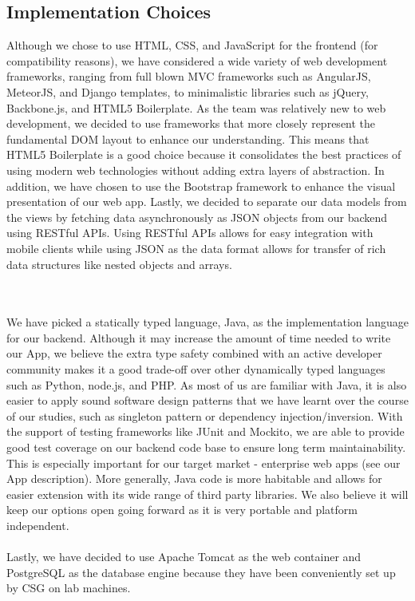 \documentclass[10pt,a4paper]{article}
\begin{document}
\subsection{Implementation Choices}

Although we chose to use HTML, CSS, and JavaScript for the frontend (for 
compatibility reasons), we have considered a wide variety of web development 
frameworks, ranging from full blown MVC frameworks such as AngularJS, MeteorJS, 
and Django templates, to minimalistic libraries such as jQuery, Backbone.js, and 
HTML5 Boilerplate. As the team was relatively new to web development, we decided 
to use frameworks that more closely represent the fundamental DOM layout to 
enhance our understanding. This means that HTML5 Boilerplate is a good choice 
because it consolidates the best practices of using modern web technologies 
without adding extra layers of abstraction. In addition, we have chosen to use 
the Bootstrap framework to enhance the visual presentation of our web app. 
Lastly, we decided to separate our data models from the views by fetching data 
asynchronously as JSON objects from our backend using RESTful APIs. Using 
RESTful APIs allows for easy integration with mobile clients while using JSON as 
the data format allows for transfer of rich data structures like nested objects 
and arrays.

\\
\\
\noindent
We have picked a statically typed language, Java, as the implementation language 
for our backend. Although it may increase the amount of time needed to write our 
App, we believe the extra type safety combined with an active developer 
community makes it a good trade-off over other dynamically typed languages such 
as Python, node.js, and PHP. As most of us are familiar with Java, it is also 
easier to apply sound software design patterns that we have learnt over the 
course of our studies, such as singleton pattern or dependency 
injection/inversion. With the support of testing frameworks like JUnit and 
Mockito, we are able to provide good test coverage on our backend code base to 
ensure long term maintainability. This is especially important for our target 
market - enterprise web apps (see our App description). More generally, Java 
code is more habitable and allows for easier extension with its wide range of 
third party libraries. We also believe it will keep our options open going 
forward as it is very portable and platform independent.
\\
\\
\noindent
Lastly, we have decided to use Apache Tomcat as the web container and PostgreSQL 
as the database engine because they have been conveniently set up by CSG on lab 
machines.
\end{document}
